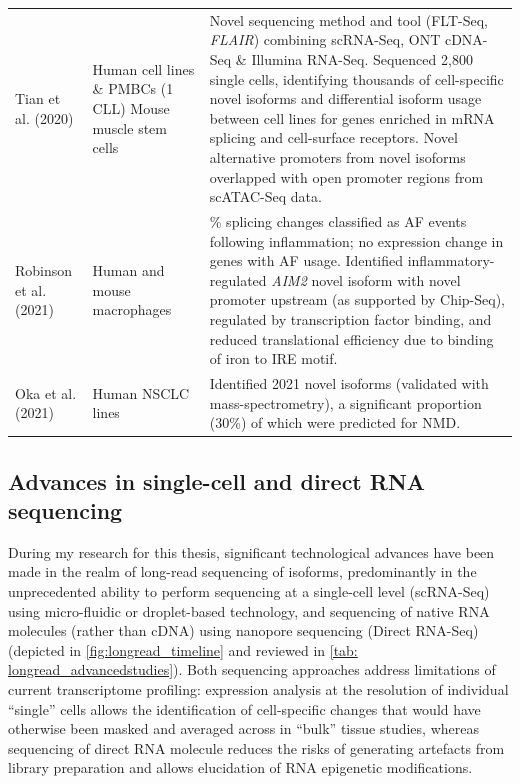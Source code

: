\begin{landscape}
\begin{longtable}[c]{p{4cm}p{4cm}p{18cm}}
		\centering Tian et al. (2020) \cite{Tian2020} &
		\centering Human cell lines \& PMBCs (1 CLL) \newline Mouse muscle stem cells &
		\tabitem Novel sequencing method and tool (FLT-Seq, \textit{FLAIR}) combining scRNA-Seq, ONT cDNA-Seq \& Illumina RNA-Seq. \newline 
		\tabitem Sequenced 2,800 single cells, identifying thousands of cell-specific novel isoforms and differential isoform usage between cell lines for genes enriched in mRNA splicing and cell-surface receptors. \newline 
		\tabitem Novel alternative promoters from novel isoforms overlapped with open promoter regions from scATAC-Seq data.\\
		\hdashline[0.5pt/5pt]
		
		
		\centering Robinson et al. (2021) \cite{Robinson2021} &
		\centering Human and mouse macrophages &
		\tabitem 50\% splicing changes classified as AF events following inflammation; no expression change in genes with AF usage. \newline 
		\tabitem Identified inflammatory-regulated \textit{AIM2} novel isoform with novel promoter upstream (as supported by Chip-Seq), regulated by transcription factor binding, and reduced translational efficiency due to binding of iron to IRE motif. \\
		\hdashline[0.5pt/5pt]
		
		\centering Oka et al. (2021) \cite{Oka2021} &
		\centering Human NSCLC lines &
		\tabitem Identified 2021 novel isoforms (validated with mass-spectrometry), a significant proportion (30\%) of which were predicted for NMD. \\* \bottomrule
	\end{longtable}
\end{landscape}
\restoregeometry



\subsection{Advances in single-cell and direct RNA sequencing}
During my research for this thesis, significant technological advances have been made in the realm of long-read sequencing of isoforms, predominantly in the unprecedented ability to perform sequencing at a single-cell level (scRNA-Seq) using micro-fluidic or droplet-based technology, and sequencing of native RNA molecules (rather than cDNA) using nanopore sequencing (Direct RNA-Seq) (depicted in \cref{fig:longread_timeline} and reviewed in \cref{tab: longread_advancedstudies}). Both sequencing approaches address limitations of current transcriptome profiling: expression analysis at the resolution of individual “single” cells allows the identification of cell-specific changes that would have otherwise been masked and averaged across in “bulk” tissue studies, whereas sequencing of direct RNA molecule reduces the risks of generating artefacts from library preparation and allows elucidation of RNA epigenetic modifications\cite{Bayega2018}. 

